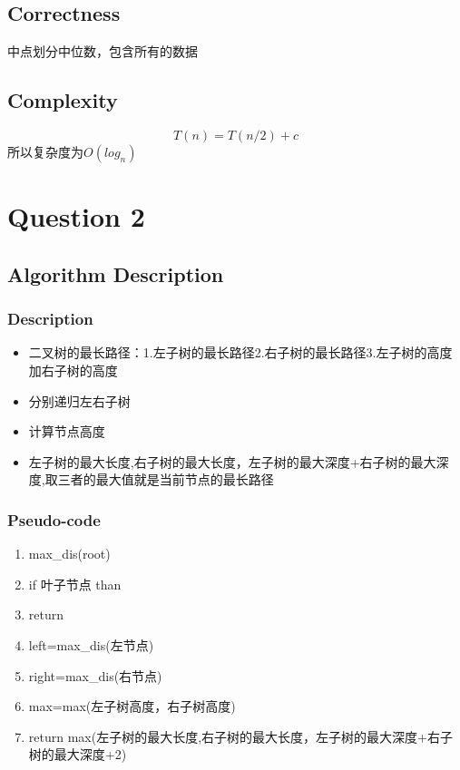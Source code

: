 \documentclass{article}
\begin{document}
\subsection{Correctness}
中点划分中位数，包含所有的数据

\subsection{Complexity}
  $$ T(n) = T(n/2) + c $$
所以复杂度为$O(log_n)$

\section{Question 2}
\subsection{Algorithm Description}
  \subsubsection{Description}
  \begin{itemize}
  \item 二叉树的最长路径：1.左子树的最长路径2.右子树的最长路径3.左子树的高度加右子树的高度
  \item 分别递归左右子树
  \item 计算节点高度
  \item 左子树的最大长度,右子树的最大长度，左子树的最大深度+右子树的最大深度,取三者的最大值就是当前节点的最长路径
  \end{itemize}

  \subsubsection{Pseudo-code}
  \begin{enumerate}[1:]
  \item max_dis(root)
  \item if 叶子节点 than
  \item   return
  \item left=max_dis(左节点)
  \item right=max_dis(右节点)
  \item max=max(左子树高度，右子树高度)
  \item return max(左子树的最大长度,右子树的最大长度，左子树的最大深度+右子树的最大深度+2)
  \end{enumerate}
\end{document}
